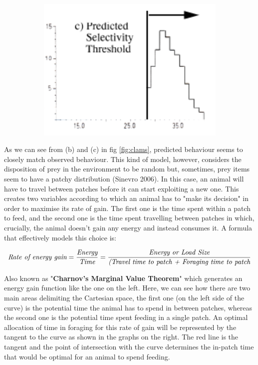 \documentclass{mproj}
\begin{document}
\begin{figure}[!h]
\begin{subfigure} [h] {0.3\textwidth}
        \end{subfigure}
	\space
	\space
	\begin{subfigure} [h] {0.3\textwidth}
                \centering
                \includegraphics [width=1\textwidth] {clam3.png}
		\caption{}

        \end{subfigure}
\end{figure}

As we can see from (b) and (c) in fig \ref{fig:clams}, predicted behaviour seems to closely match observed behaviour. This kind of model, however, considers the disposition of prey in the environment to be random but, sometimes, prey items seem to have a patchy distribution (Sinevro 2006). In this case, an animal will have to travel between patches before it can start exploiting a new one. This creates two variables according to which an animal has to "make its decision" in order to maximise its rate of gain. The first one is the time spent within a patch to feed, and the second one is the time spent travelling between patches in which, crucially, the animal doesn't gain any energy and instead consumes it. A formula that effectively models this choice is:

\begin{equation*}
\emph{Rate of energy gain} = \frac{\emph{Energy}}{ \emph{Time}} = \frac {\emph{Energy or Load Size}}{ \emph{(Travel time to patch + Foraging time to patch}}
\end{equation*}

Also known as "\textbf{Charnov's Marginal Value Theorem}" which generates an energy gain function like the one on the left. Here, we can see how there are two main areas delimiting the Cartesian space, the first one (on the left side of the curve) is the potential time the animal has to spend in between patches, whereas the second one is the potential time spent feeding in a single patch. An optimal allocation of time in foraging for this rate of gain will be represented by the tangent to the curve as shown in the graphs on the right. The red line is the tangent and the point of intersection with the curve determines the in-patch time that would be optimal for an animal to spend feeding.
\end{document}

